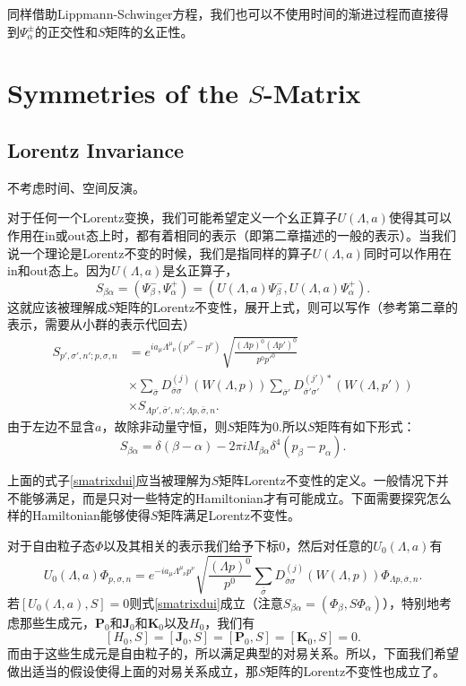同样借助Lippmann-Schwinger方程，我们也可以不使用时间的渐进过程而直接得到$\Psi_\alpha^\pm$的正交性和$S$矩阵的幺正性。

\section{Symmetries of the $S$-Matrix}
\subsection*{Lorentz Invariance}
不考虑时间、空间反演。

对于任何一个Lorentz变换，我们可能希望定义一个幺正算子$U(\Lambda,a)$使得其可以作用在in或out态上时，都有着相同的表示（即第二章描述的一般的表示）。当我们说一个理论是Lorentz不变的时候，我们是指同样的算子$U(\Lambda,a)$同时可以作用在in和out态上。因为$U(\Lambda,a)$是幺正算子，
\[
S_{\beta\alpha}=\left(\Psi_\beta^-,\Psi_\alpha^+\right)=\left(U(\Lambda,a)\Psi_\beta^-,U(\Lambda,a)\Psi_\alpha^+\right).
\]
这就应该被理解成$S$矩阵的Lorentz不变性，展开上式，则可以写作（参考第二章的表示，需要从小群的表示代回去）
\begin{equation}
\label{smatrixdui}
\begin{split}
	S_{p',\sigma',n';p,\sigma,n}&=e^{ia_\mu\Lambda^\mu_{\phantom{\mu}\nu}(p'^\nu-p^\nu)}\sqrt{\frac{(\Lambda p)^0 (\Lambda p')^0}{p^0p'^0}}\\
	&\times\sum_{\bar{\sigma}} D^{(j)}_{\bar{\sigma}\sigma}(W(\Lambda,p))\sum_{\bar{\sigma}'} D^{(j')*}_{\bar{\sigma}'\sigma'}(W(\Lambda,p'))\\
	&\times S_{\Lambda p',\bar{\sigma}',n';\Lambda p,\bar{\sigma},n}.
\end{split}
\end{equation}
由于左边不显含$a$，故除非动量守恒，则$S$矩阵为0.所以$S$矩阵有如下形式：
\[
S_{\beta\alpha}=\delta(\beta-\alpha)-2\pi iM_{\beta\alpha}\delta^4(p_\beta-p_\alpha).
\]

上面的式子\eqref{smatrixdui}应当被理解为$S$矩阵Lorentz不变性的定义。一般情况下并不能够满足，而是只对一些特定的Hamiltonian才有可能成立。下面需要探究怎么样的Hamiltonian能够使得$S$矩阵满足Lorentz不变性。

对于自由粒子态$\Phi$以及其相关的表示我们给予下标0，然后对任意的$U_0(\Lambda,a)$有
\[
U_0(\Lambda,a)\Phi_{p,\sigma,n}=e^{-ia_\mu\Lambda^\mu_{\phantom{\mu}\nu}p^\nu}\sqrt{\frac{(\Lambda p)^0}{p^0}}\sum_{\bar{\sigma}} D^{(j)}_{\bar{\sigma}\sigma}(W(\Lambda,p))\Phi_{\Lambda p,\bar{\sigma},n}.
\]
若$[U_0(\Lambda,a),S]=0$则式\eqref{smatrixdui}成立（注意$S_{\beta\alpha}=(\Phi_\beta,S\Phi_\alpha)$），特别地考虑那些生成元，$\bm{P}_0$和$\bm{J}_0$和$\bm{K}_0$以及$H_0$，我们有
\[
	[H_0,S]=[\bm{J}_0,S]=[\bm{P}_0,S]=[\bm{K}_0,S]=0.
\]
而由于这些生成元是自由粒子的，所以满足典型的对易关系。所以，下面我们希望做出适当的假设使得上面的对易关系成立，那$S$矩阵的Lorentz不变性也成立了。

